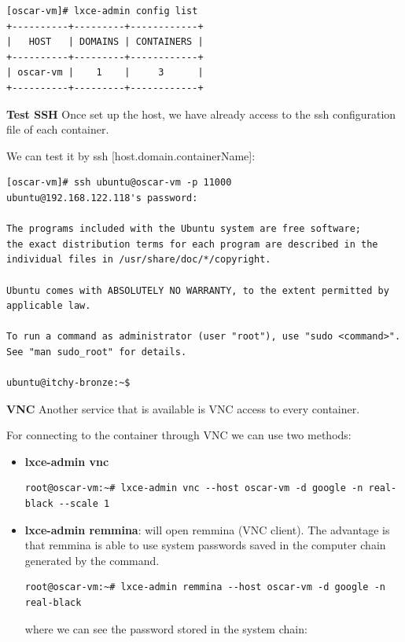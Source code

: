 \begin{verbatim}
[oscar-vm]# lxce-admin config list                                                                 
+----------+---------+------------+
|   HOST   | DOMAINS | CONTAINERS |
+----------+---------+------------+
| oscar-vm |    1    |     3      |
+----------+---------+------------+
\end{verbatim}

\textbf{Test SSH}
Once set up the host, we have already access to the ssh configuration file of each container.

We can test it by ssh [host.domain.containerName]:
\begin{verbatim}
[oscar-vm]# ssh ubuntu@oscar-vm -p 11000           
ubuntu@192.168.122.118's password:

The programs included with the Ubuntu system are free software;
the exact distribution terms for each program are described in the
individual files in /usr/share/doc/*/copyright.

Ubuntu comes with ABSOLUTELY NO WARRANTY, to the extent permitted by
applicable law.

To run a command as administrator (user "root"), use "sudo <command>".
See "man sudo_root" for details.

ubuntu@itchy-bronze:~$
\end{verbatim}

\textbf{VNC}
Another service that is available is VNC access to every container.

For connecting to the container through VNC we can use two methods:
\begin{itemize}
	\item{\textbf{lxce-admin vnc}}
\begin{verbatim}
root@oscar-vm:~# lxce-admin vnc --host oscar-vm -d google -n real-black --scale 1
\end{verbatim}
	\item{\textbf{lxce-admin remmina}: will open remmina (VNC client). The advantage is that remmina is able to use system passwords saved in the computer chain generated by the command.}
\begin{verbatim}
root@oscar-vm:~# lxce-admin remmina --host oscar-vm -d google -n real-black
\end{verbatim}
where we can see the password stored in the system chain:
\end{itemize}

